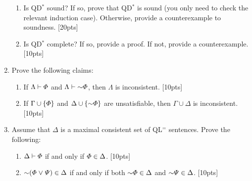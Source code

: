 \documentclass[12pt]{article}
\begin{document}
\begin{enumerate}
    \begin{enumerate}
      \item Is QD$^*$ sound?
        If so, prove that QD$^*$ is sound (you only need to check the relevant induction case).
        Otherwise, provide a counterexample to soundness. [20pts]
      \item Is QD$^*$ complete? If so, provide a proof. If not, provide a counterexample. [10pts] 
    \end{enumerate}

  \item Prove the following claims:
    \begin{enumerate}
      \item If $\Lambda\vdash\varPhi$ and $\Lambda\vdash\enot\metaA$, then $\Lambda$ is inconsistent. [10pts] 
      \item If $\Gamma \cup \lbrace\varPhi\rbrace$ and $\Delta \cup \set{\enot \metaA}$ are unsatisfiable, then $\Gamma \cup \Delta$ is inconsistent. [10pts] 
    \end{enumerate}


  \item Assume that $\Delta$ is a maximal consistent set of QL$^=$ sentences.
  Prove the following:
    \begin{enumerate}
      \item $\Delta\vdash\varPhi$ if and only if $\varPhi\in\Delta$. [10pts]
      \item $\enot (\metaA \eor \metaB) \in \Delta$ if and only if both $\enot\metaA\in \Delta$ and $\enot\metaB\in \Delta$. [10pts]
    \end{enumerate}
    




\end{enumerate}
\end{document}
